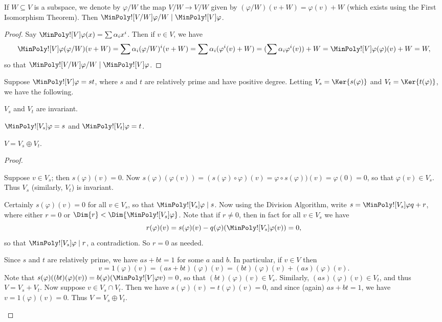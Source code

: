 \documentclass{memoir}
\begin{document}
\begin{prp}
If $W \subseteq V$ is a subspace, we denote by $\varphi/W$ the map $V/W \rightarrow V/W$ given by $(\varphi/W)(v+W) = \varphi(v)+W$ (which exists using the First Isomorphism Theorem). Then $\MinPoly![V/W]{\varphi/W} \mid \MinPoly![V]{\varphi}$.
\end{prp}

\begin{proof}
Say $\MinPoly![V]{\varphi}(x) = \sum \alpha_i x^i$. Then if $v \in V$, we have \[ \MinPoly![V]{\varphi}(\varphi/W)(v+W) = \sum \alpha_i (\varphi/W)^i (v+W) = \sum \alpha_i (\varphi^i(v) + W) = (\sum \alpha_i \varphi^i(v)) + W = \MinPoly![V]{\varphi}(\varphi)(v) + W = W, \] so that $\MinPoly![V/W]{\varphi/W} \mid \MinPoly![V]{\varphi}$.
\end{proof}

\begin{prp}
Suppose $\MinPoly![V]{\varphi} = st$, where $s$ and $t$ are relatively prime and have positive degree. Letting $V_s = \Ker{s(\varphi)}$ and $V_t = \Ker{t(\varphi)}$, we have the following.
\begin{enumerate*}
\item $V_s$ and $V_t$ are invariant.
\item $\MinPoly![V_s]{\varphi} = s$ and $\MinPoly![V_t]{\varphi} = t$.
\item $V = V_s \oplus V_t$.
\end{enumerate*}
\end{prp}

\begin{proof} \mbox{}
\begin{enumerate*}
\item Suppose $v \in V_s$; then $s(\varphi)(v) = 0$. Now $s(\varphi)(\varphi(v)) = (s(\varphi) \circ \varphi)(v) = \varphi \circ s(\varphi))(v) = \varphi(0) = 0$, so that $\varphi(v) \in V_s$. Thus $V_s$ (similarly, $V_t$) is invariant.
\item Certainly $s(\varphi)(v) = 0$ for all $v \in V_s$, so that $\MinPoly![V_s]{\varphi} \mid s$. Now using the Division Algorithm, write $s = \MinPoly![V_s]{\varphi} q + r$, where either $r = 0$ or $\Dim{r} < \Dim{\MinPoly![V_s]{\varphi}}$. Note that if $r \neq 0$, then in fact for all $v \in V_s$ we have \[ r(\varphi)(v) = s(\varphi)(v) - q(\varphi)(\MinPoly![V_s]{\varphi}(v)) = 0, \] so that $\MinPoly![V_s]{\varphi} \mid r$, a contradiction. So $r = 0$ as needed.
\item Since $s$ and $t$ are relatively prime, we have $as + bt = 1$ for some $a$ and $b$. In particular, if $v \in V$ then \[ v = 1(\varphi)(v) = (as+bt)(\varphi)(v) = (bt)(\varphi)(v) + (as)(\varphi)(v). \] Note that $s(\varphi)((bt)(\varphi)(v)) = b(\varphi)(\MinPoly![V]{\varphi}{v}) = 0$, so that $(bt)(\varphi)(v) \in V_s$. Similarly, $(as)(\varphi)(v) \in V_t$, and thus $V = V_s + V_t$. Now suppose $v \in V_s \cap V_t$. Then we have $s(\varphi)(v) = t(\varphi)(v) = 0$, and since (again) $as+bt = 1$, we have $v = 1(\varphi)(v) = 0$. Thus $V = V_s \oplus V_t$. \qedhere
\end{enumerate*}
\end{proof}
\end{document}
